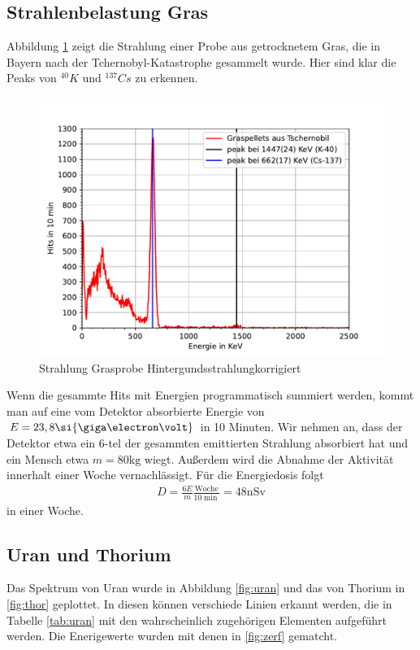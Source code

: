 \documentclass[11pt, a4paper]{article}
\begin{document}
    \subsection{Strahlenbelastung Gras}
    Abbildung \ref{fig:gras} zeigt die Strahlung einer Probe aus getrocknetem Gras, die in Bayern nach der Tchernobyl-Katastrophe gesammelt wurde. Hier sind klar die Peaks von $^{40}K$ und $^{137}Cs$ zu erkennen.
    \begin{figure}[!h]
        \centering
        \includegraphics[width=\textwidth]{Plots/Tschern.pdf}
        \caption{Strahlung Grasprobe Hintergundsstrahlungkorrigiert}
        \label{fig:gras}
    \end{figure}
    Wenn die gesammte Hits mit Energien programmatisch summiert werden, kommt man auf eine vom Detektor absorbierte Energie von $E = 23,8 \si{\giga\electron\volt}$ in 10 Minuten. Wir nehmen an, dass der Detektor etwa ein 6-tel der gesammten emittierten Strahlung absorbiert hat und ein Mensch etwa $m = 80 \si{\kilogram}$ wiegt. Außerdem wird die Abnahme der Aktivität innerhalt einer Woche vernachlässigt. Für die Energiedosis folgt
    \begin{align}
        D = \frac{6 E}{m} \frac{\text{Woche}}{10 \si{\min}} = 48 \si{\nano\sievert}
    \end{align}
    in einer Woche.



    \subsection{Uran und Thorium}
    Das Spektrum von Uran wurde in Abbildung \ref{fig:uran} und das von Thorium in \ref{fig:thor} geplottet. In diesen können verschiede Linien erkannt werden, die in Tabelle \ref{tab:uran} mit den wahrscheinlich zugehörigen Elementen aufgeführt werden. Die Enerigewerte wurden mit denen in \ref{fig:zerf} gematcht.
\end{document}
